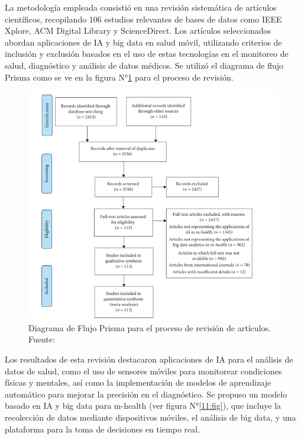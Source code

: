 La metodología empleada consistió en una revisión sistemática de artículos científicos, recopilando 106 estudios relevantes de bases de datos como IEEE Xplore, ACM Digital Library y ScienceDirect. Los artículos seleccionados abordan aplicaciones de IA y big data en salud móvil, utilizando criterios de inclusión y exclusión basados en el uso de estas tecnologías en el monitoreo de salud, diagnóstico y análisis de datos médicos. Se utilizó el diagrama de flujo Prisma como se ve en la figura N°\ref{10:fig} para el proceso de revisión.

\begin{figure}[H]
	\centering
	\includegraphics[width=\textwidth]{2/figures/PRISMA.png}
	\caption{Diagrama de Flujo Prisma para el proceso de revisión de artículos. Fuente: \cite{khan2020}}
	\label{10:fig}
\end{figure}



Los resultados de esta revisión destacaron aplicaciones de IA para el análisis de datos de salud, como el uso de sensores móviles para monitorear condiciones físicas y mentales, así como la implementación de modelos de aprendizaje automático para mejorar la precisión en el diagnóstico. Se propuso un modelo basado en IA y big data para m-health (ver figura N°\ref{11:fig}), que incluye la recolección de datos mediante dispositivos móviles, el análisis de big data, y una plataforma para la toma de decisiones en tiempo real.

